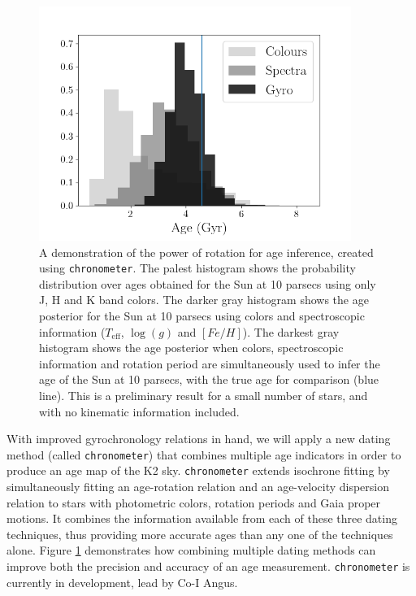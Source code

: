 \documentclass[12pt]{article}
\begin{document}
\begin{figure}[!t]
\centering
\includegraphics[width=4in]{all_hist_working.png}
\caption{A demonstration of the power of rotation for age
    inference, created using {\tt chronometer}.
    The palest  histogram shows the probability distribution over ages
    obtained for the Sun at 10 parsecs using only J, H and K band colors.
    The darker gray histogram shows the age posterior for the Sun at 10
    parsecs using colors and spectroscopic information ($T_{\mathrm{eff}}$,
    $\log(g)$ and $[Fe/H]$).
    The darkest gray histogram shows the age posterior when colors,
    spectroscopic information and rotation period are simultaneously used to infer the age of
    the Sun at 10 parsecs, with the true age for comparison (blue line).
    This is a preliminary result for a small number of stars, and with no kinematic information included.
}
\label{fig:chrono}
\end{figure}



With improved gyrochronology relations in hand, we
will apply a new dating method (called {\tt chronometer}) that combines
multiple age indicators in order to produce an age map of the K2 sky.
{\tt chronometer} extends isochrone fitting by simultaneously fitting an
age-rotation relation and an age-velocity dispersion relation to stars with
photometric colors, rotation periods and Gaia proper motions.
It combines the information available from each of these three dating techniques, thus
providing more accurate ages than any one of the techniques alone.
Figure \ref{fig:chrono} demonstrates how combining multiple dating methods can
improve both the precision and accuracy of an age measurement.
{\tt chronometer} is currently in development, lead by Co-I Angus.
\end{document}

